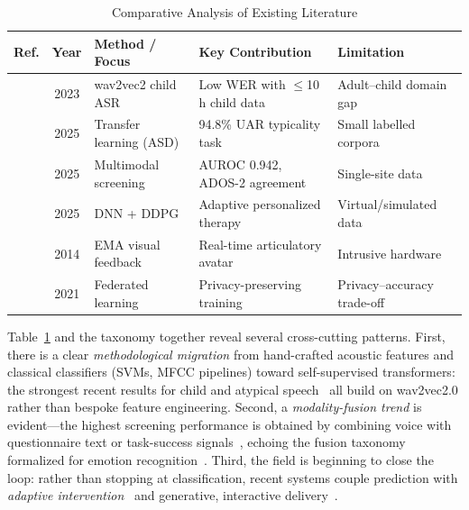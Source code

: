 \documentclass[conference]{IEEEtran}
\begin{document}
\begin{table}[!t]
\renewcommand{\arraystretch}{1.3}
\caption{Comparative Analysis of Existing Literature}
\label{tab:comparison}
\centering
\footnotesize
\begin{tabular}{@{}c c p{1.3cm} p{1.5cm} p{1.5cm}@{}}
\toprule
\textbf{Ref.} & \textbf{Year} & \textbf{Method / Focus} & \textbf{Key Contribution} & \textbf{Limitation}\\
\midrule
\cite{ref1}  & 2023 & wav2vec2 child ASR & Low WER with $\leq$10\,h child data & Adult--child domain gap\\
\cite{ref3}  & 2025 & Transfer learning (ASD) & 94.8\% UAR typicality task & Small labelled corpora\\
\cite{ref10} & 2025 & Multimodal screening & AUROC 0.942, ADOS-2 agreement & Single-site data\\
\cite{ref11} & 2025 & DNN + DDPG & Adaptive personalized therapy & Virtual/simulated data\\
\cite{ref16} & 2014 & EMA visual feedback & Real-time articulatory avatar & Intrusive hardware\\
\cite{ref24} & 2021 & Federated learning & Privacy-preserving training & Privacy--accuracy trade-off\\
\bottomrule
\end{tabular}
\end{table}

Table~\ref{tab:comparison} and the taxonomy together reveal several cross-cutting patterns. First, there is a clear \emph{methodological migration} from hand-crafted acoustic features and classical classifiers (SVMs, MFCC pipelines) toward self-supervised transformers: the strongest recent results for child and atypical speech~\cite{ref1,ref2,ref3,ref4} all build on wav2vec2.0 rather than bespoke feature engineering. Second, a \emph{modality-fusion trend} is evident---the highest screening performance is obtained by combining voice with questionnaire text or task-success signals~\cite{ref10}, echoing the fusion taxonomy formalized for emotion recognition~\cite{ref18,ref19}. Third, the field is beginning to close the loop: rather than stopping at classification, recent systems couple prediction with \emph{adaptive intervention}~\cite{ref11} and generative, interactive delivery~\cite{ref14,ref15}.
\end{document}
